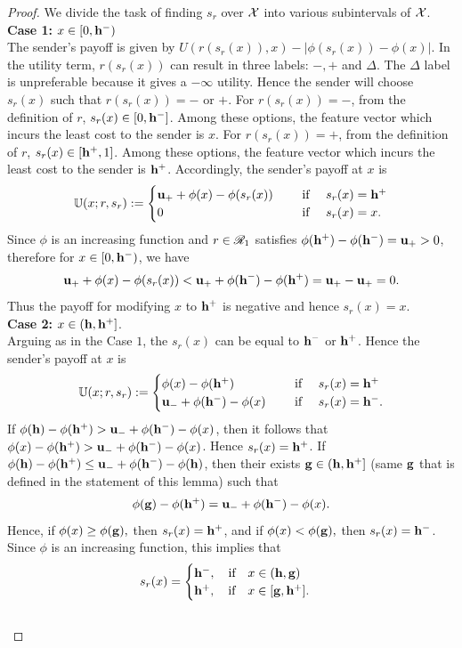 \begin{proof}\label{proof:Best response r1}
    We divide the task of finding $s_r$ over $\mathcal{X}$ into various subintervals of $\mathcal{X}$.\\
\textbf{Case 1: }{$x \in [0, \mathbf{h^{-}})$\\} The sender's payoff is given by $U(r(s_r(x)),x) - |\phi(s_r(x))-\phi(x)|$.
	In the utility term, $r(s_r(x))$ can result in three labels: $\minus, \plus$ and $\Delta$. The $\Delta$ label is unpreferable because it gives a $-\infty$ utility.
	Hence the sender will choose $s_r(x)$ such that $r(s_r(x)) = \minus$ or $ \plus$.
	For $r(s_r(x)) = \minus$, from the definition of $r$, $s_r(x) \in [0,\mathbf{h^{-}}]$. Among these options, the feature vector which incurs the least cost to the sender is $x$.
	For $r(s_r(x)) = \plus$, from the definition of $r$, $s_r(x) \in [\mathbf{h^{+}},1]$. Among these options, the feature vector which incurs the least cost to the sender is $\mathbf{h^{+}}$.
	Accordingly, the sender's payoff at $x$ is
		\[\senpayoff(x;r,s_r) := \begin{cases}
			\up + \phi(x) - \phi(s_r(x)) & \text{ if } s_r(x)= \jb \\
			0& \text{ if }s_r(x) = x.\\
		\end{cases}\]
	 Since $\phi$ is an increasing function and $r \in \mathscr{R}_1$ satisfies $\phi(\mathbf{h^{+}}) - \phi(\mathbf{h^{-}}) = \mathbf{u_+} > 0$, therefore for $x \in [0, \mathbf{h^{-}})$, we have $$\mathbf{u_+} + \phi(x) - \phi(s_r(x))  < \mathbf{u_+} + \phi(\mathbf{h^{-}}) - \phi(\mathbf{h^{+}}) = \mathbf{u_+} -\mathbf{u_+}  = 0.$$ Thus the payoff for modifying $x$ to $\mathbf{h^{+}}$ is negative and hence $s_r(x) = x$.\\

\textbf{Case 2:}
		 $x \in (\mathbf{h},\mathbf{h^{+}}]$.\\ Arguing as in the Case $1$, the $s_r(x)$ can be equal to $\mathbf{h^{-}}$ or $\mathbf{h^{+}}$. Hence the sender's payoff at $x$ is
		\[\senpayoff(x;r,s_r) := \begin{cases}
			\phi(x) - \phi(\jb)  & \text{ if } s_r(x) = \jb \\
		\um + \phi(\ib) - \phi(x)& \text{ if }s_r(x)=\ib.\\
		\end{cases}\]
	If $\phi(\mathbf{h}) - \phi(\mathbf{h^{+}}) > \mathbf{u_-} + \phi(\mathbf{h^{-}}) - \phi(x)$, then it follows that $\phi(x) - \phi(\mathbf{h^{+}}) > \mathbf{u_-} + \phi(\mathbf{h^{-}}) - \phi(x)$. Hence $s_r(x) = \mathbf{h^{+}}$.
	If $\phi(\mathbf{h}) - \phi(\mathbf{h^{+}}) \leq \mathbf{u_-} + \phi(\mathbf{h^{-}}) - \phi(\mathbf{h})$, then their exists $\mathbf{g} \in (\mathbf{h},\mathbf{h^{+}}]$ (same $\mathbf{g}$ that is defined in the statement of this lemma) such that
	\[\phi(\mathbf{g}) - \phi(\mathbf{h^{+}}) = \mathbf{u_-} + \phi(\mathbf{h^{-}}) - \phi(x).\] Hence, if $\phi(x) \geq \phi(\mathbf{g}),$ then $s_r(x) = \mathbf{h^{+}}$, and if $\phi(x) < \phi(\mathbf{g}),$ then $s_r(x) = \mathbf{h^{-}}$.
	Since $\phi$ is an increasing function, this implies that
	 \[s_r(x) = \begin{cases}
	 	\mathbf{h^{-}}, \hbox{\quad if\quad} x \in (\mathbf{h},\mathbf{g})\\
	 	\mathbf{h^{+}}, \hbox{\quad if\quad} x \in [\mathbf{g},\mathbf{h^{+}}].
	 \end{cases}\]\\



\end{proof}
